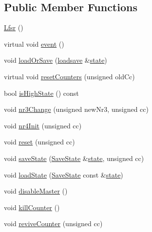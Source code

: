 \subsection*{Public Member Functions}
\begin{DoxyCompactItemize}
\item 
\hyperlink{classgambatte_1_1Channel4_1_1Lfsr_a070b6af35c8738378554108722c117ae}{Lfsr} ()
\item 
virtual void \hyperlink{classgambatte_1_1Channel4_1_1Lfsr_a019ab6fad6c598fdc6f061b70df93fdc}{event} ()
\item 
void \hyperlink{classgambatte_1_1Channel4_1_1Lfsr_a7efc0bc0a1075903d2228997d5ecfafa}{load\+Or\+Save} (\hyperlink{classgambatte_1_1loadsave}{loadsave} \&\hyperlink{ppu_8cpp_a2f2eca6997ee7baf8901725ae074d45b}{state})
\item 
virtual void \hyperlink{classgambatte_1_1Channel4_1_1Lfsr_acdeb93a45132b45567f97878ed6306b9}{reset\+Counters} (unsigned old\+Cc)
\item 
bool \hyperlink{classgambatte_1_1Channel4_1_1Lfsr_ac711ac75e9618a2a00305909dd1f380e}{is\+High\+State} () const
\item 
void \hyperlink{classgambatte_1_1Channel4_1_1Lfsr_a2247d65d109fdcf2f284cbb1c22ec839}{nr3\+Change} (unsigned new\+Nr3, unsigned cc)
\item 
void \hyperlink{classgambatte_1_1Channel4_1_1Lfsr_addb216b88720928bdf43b93366dd187d}{nr4\+Init} (unsigned cc)
\item 
void \hyperlink{classgambatte_1_1Channel4_1_1Lfsr_a8a7f22b16436748c37b64fca7c4e7774}{reset} (unsigned cc)
\item 
void \hyperlink{classgambatte_1_1Channel4_1_1Lfsr_ab3f65da97d38ed85258dbe58fe282d4f}{save\+State} (\hyperlink{structgambatte_1_1SaveState}{Save\+State} \&\hyperlink{ppu_8cpp_a2f2eca6997ee7baf8901725ae074d45b}{state}, unsigned cc)
\item 
void \hyperlink{classgambatte_1_1Channel4_1_1Lfsr_a7600ceb0f1867552977cfcc5fd07e39b}{load\+State} (\hyperlink{structgambatte_1_1SaveState}{Save\+State} const \&\hyperlink{ppu_8cpp_a2f2eca6997ee7baf8901725ae074d45b}{state})
\item 
void \hyperlink{classgambatte_1_1Channel4_1_1Lfsr_a9853ba5c6b10344cea14208f3c5a5558}{disable\+Master} ()
\item 
void \hyperlink{classgambatte_1_1Channel4_1_1Lfsr_a2ed2547ea57bf2ecf592345c8066419d}{kill\+Counter} ()
\item 
void \hyperlink{classgambatte_1_1Channel4_1_1Lfsr_a6cbac4af17a2cb4cc35ef46d850ed2dd}{revive\+Counter} (unsigned cc)
\end{DoxyCompactItemize}
